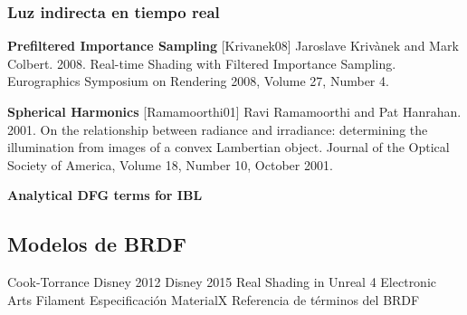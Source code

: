 

        \subsubsection*{Luz indirecta en tiempo real}

            \textbf{Prefiltered Importance Sampling}
            [Krivanek08] Jaroslave Krivànek and Mark Colbert. 2008. Real-time Shading with Filtered Importance Sampling. Eurographics Symposium on Rendering 2008, Volume 27, Number 4.

            \textbf{Spherical Harmonics}
            [Ramamoorthi01] Ravi Ramamoorthi and Pat Hanrahan. 2001. On the relationship between radiance and irradiance: determining the illumination from images of a convex Lambertian object. Journal of the Optical Society of America, Volume 18, Number 10, October 2001.

            \textbf{Analytical DFG terms for IBL}

    \subsection{Modelos de BRDF}
    Cook-Torrance \autocite{cooktorrance}
    Disney 2012 \autocite{disney12}
    Disney 2015 \autocite{disney15}
    Real Shading in Unreal 4 \autocite{unreal}
    Electronic Arts \autocite{frostbite}
    Filament \autocite{filament}
    Especificaci\'on MaterialX \autocite{materialx}
    Referencia de t\'erminos del BRDF \autocite{brdfreference}
